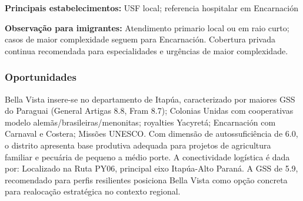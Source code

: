 \textbf{Principais estabelecimentos:} USF local; referencia hospitalar
em Encarnación

\textbf{Observação para imigrantes:} Atendimento primario local ou em
raio curto; casos de maior complexidade seguem para Encarnación.
Cobertura privada continua recomendada para especialidades e urgências
de maior complexidade.
\newpage

\subsubsection*{Oportunidades}\label{oport-bella-vista-0702}
Bella Vista insere-se no departamento de Itapúa, caracterizado por maiores GSS do Paraguai (General Artigas 8.8, Fram 8.7); Colonias Unidas com cooperativas modelo alemãs/brasileiras/menonitas; royalties Yacyretá; Encarnación com Carnaval e Costera; Missões UNESCO. Com dimensão de autossuficiência de 6.0, o distrito apresenta base produtiva adequada para projetos de agricultura familiar e pecuária de pequeno a médio porte. A conectividade logística é dada por: Localizado na Ruta PY06, principal eixo Itapúa-Alto Paraná. A GSS de 5.9, recomendado para perfis resilientes posiciona Bella Vista como opção concreta para realocação estratégica no contexto regional.


